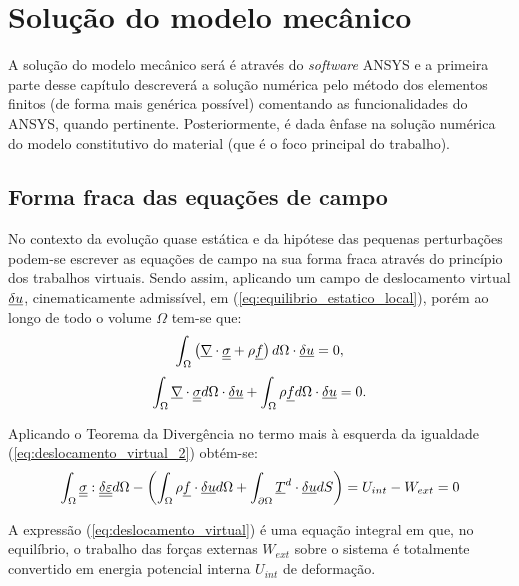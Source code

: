 \chapter{Solução do modelo mecânico}
A solução do modelo mecânico será é através do \textit{software} ANSYS e a primeira parte desse capítulo descreverá a solução numérica pelo método dos elementos finitos (de forma mais genérica possível) comentando as funcionalidades do ANSYS, quando pertinente. Posteriormente, é dada ênfase na solução numérica do modelo constitutivo do material (que é o foco principal do trabalho). 

\section{Forma fraca das equações de campo}
No contexto da evolução quase estática e da hipótese das pequenas perturbações podem-se escrever as equações de campo na sua forma fraca através do princípio dos trabalhos virtuais. Sendo assim, aplicando um campo de deslocamento virtual $\underline {\delta u}$, cinematicamente admissível, em (\ref{eq:equilibrio_estatico_local}), porém ao longo de todo o volume $\Omega$ tem-se que:
\begin{equation}
	\label{eq:deslocamento_virtual}
	\int_{\Omega} \left(\underline \nabla \cdot \underline{\underline \sigma} + \rho \underline f \right)d\Omega \cdot \underline {\delta u} = 0,
\end{equation}
\begin{equation}
	\label{eq:deslocamento_virtual_2}
	\int_{\Omega} \underline \nabla \cdot \underline{\underline \sigma} d\Omega \cdot \underline {\delta u} + \int_{\Omega} \rho \underline f d\Omega \cdot \underline {\delta u} = 0.
\end{equation}

Aplicando o Teorema da Divergência no termo mais à esquerda da igualdade (\ref{eq:deslocamento_virtual_2}) obtém-se:
\begin{equation}
	\label{eq:deslocamento_virtual_3}
	\int_{\Omega} \underline{\underline \sigma} : \underline{\underline {\delta \varepsilon}} d\Omega - \left(\int_{\Omega} \rho \underline f \cdot \underline {\delta u} d\Omega + \int_{\partial \Omega} \underline T^d \cdot \underline {\delta u} dS \right) = U_{int} - W_{ext} = 0
\end{equation}

A expressão (\ref{eq:deslocamento_virtual}) é uma equação integral em que, no equilíbrio, o trabalho das forças externas $W_{ext}$ sobre o sistema é totalmente convertido em energia potencial interna $U_{int}$  de deformação.


